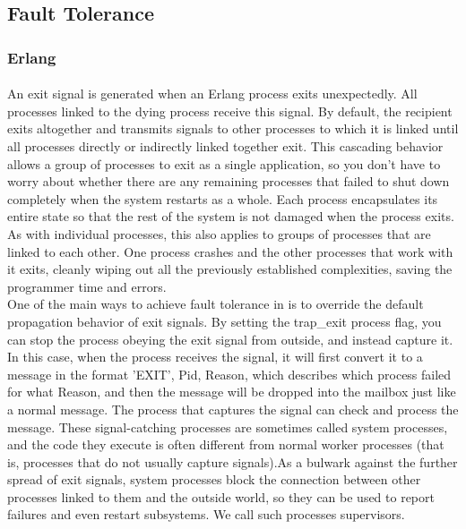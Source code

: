 \documentclass{article}
\begin{document}
\subsection{Fault Tolerance}\vspace{18pt}
\subsubsection{Erlang}\vspace{16pt}
\paragraph{}\vspace{11pt}\justifying
An exit signal is generated when an Erlang process exits unexpectedly. All processes linked to the dying process receive this signal. By default, the recipient exits altogether and transmits signals to other processes to which it is linked until all processes directly or indirectly linked together exit. This cascading behavior allows a group of processes to exit as a single application, so you don't have to worry about whether there are any remaining processes that failed to shut down completely when the system restarts as a whole. Each process encapsulates its entire state so that the rest of the system is not damaged when the process exits. As with individual processes, this also applies to groups of processes that are linked to each other. One process crashes and the other processes that work with it exits, cleanly wiping out all the previously established complexities, saving the programmer time and errors.\\

One of the main ways to achieve fault tolerance in is to override the default propagation behavior of exit signals.  By setting the trap\_exit process flag, you can stop the process obeying the exit signal from outside, and instead capture it. In this case, when the process receives the signal, it will first convert it to a message in the format {'EXIT', Pid, Reason}, which describes which process failed for what Reason, and then the message will be dropped into the mailbox just like a normal message. The process that captures the signal can check and process the message. These signal-catching processes are sometimes called system processes, and the code they execute is often different from normal worker processes (that is, processes that do not usually capture signals).As a bulwark against the further spread of exit signals, system processes block the connection between other processes linked to them and the outside world, so they can be used to report failures and even restart subsystems. We call such processes supervisors.\\
\end{document}
